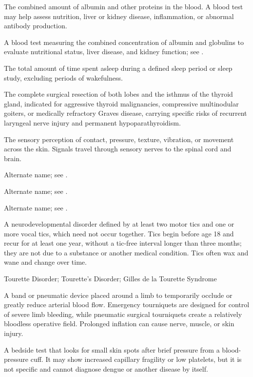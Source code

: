  The combined amount of albumin and other proteins in the blood. A blood test may help assess nutrition, liver or kidney disease, inflammation, or abnormal antibody production.

 A blood test measuring the combined concentration of albumin and globulins to evaluate nutritional status, liver disease, and kidney function; see .

 The total amount of time spent asleep during a defined sleep period or sleep study, excluding periods of wakefulness.

 The complete surgical resection of both lobes and the isthmus of the thyroid gland, indicated for aggressive thyroid malignancies, compressive multinodular goiters, or medically refractory Graves disease, carrying specific risks of recurrent laryngeal nerve injury and permanent hypoparathyroidism.

 The sensory perception of contact, pressure, texture, vibration, or movement across the skin. Signals travel through sensory nerves to the spinal cord and brain.

 Alternate name; see .

 Alternate name; see .

 Alternate name; see .

 A neurodevelopmental disorder defined by at least two motor tics and one or more vocal tics, which need not occur together.
Tics begin before age 18 and recur for at least one year, without a tic-free
interval longer than three months; they are not due to a substance or another
medical condition. Tics often wax and wane and change over time.

\synonyms
Tourette Disorder; Tourette's Disorder; Gilles de la Tourette Syndrome

 A band or pneumatic device placed around a limb to temporarily occlude or greatly reduce arterial blood flow. Emergency tourniquets are designed for control of severe limb bleeding, while pneumatic surgical tourniquets create a relatively bloodless operative field. Prolonged inflation can cause nerve, muscle, or skin injury.

 A bedside test that looks for small skin spots after brief pressure from a blood-pressure cuff. It may show increased capillary fragility or low platelets, but it is not specific and cannot diagnose dengue or another disease by itself.

